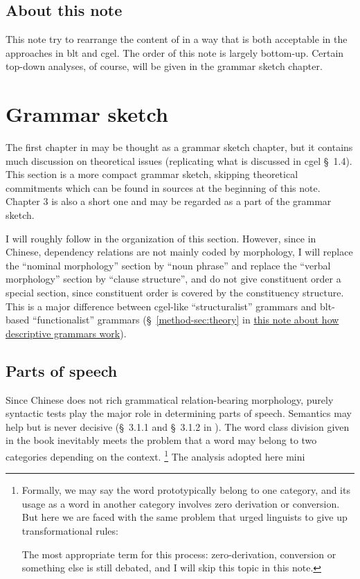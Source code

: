 \documentclass[UTF8, a4paper, oneside, scheme=plain]{ctexart}
\newcommand*{\citesec}[1]{\S~{#1}}
\newcommand{\method}{\href{../methodology/glossing.pdf}{this note about how descriptive grammars work}}
\begin{document}
\subsection{About this note}

This note try to rearrange the content of \citet{zhudexigrammar}
in a way that is both acceptable in the approaches in \ac{blt} and \ac{cgel}.
The order of this note is largely bottom-up.
Certain top-down analyses, of course, will be given in the grammar sketch chapter.

\section{Grammar sketch}

The first chapter in \citet{zhudexigrammar} may be thought as a grammar sketch chapter,
but it contains much discussion on theoretical issues
(replicating what is discussed in \ac{cgel} \citesec{1.4}).
This section is a more compact grammar sketch,
skipping theoretical commitments which can be found in sources at the beginning of this note.
Chapter 3 is also a short one and may be regarded as a part of the grammar sketch.

I will roughly follow \citet{jacques2021grammar} in the organization of this section.
However, since in Chinese, dependency relations are not mainly coded by morphology,
I will replace the ``nominal morphology'' section by ``noun phrase''
and replace the ``verbal morphology'' section by ``clause structure'',
and do not give constituent order a special section,
since constituent order is covered by the constituency structure.
This is a major difference between \ac{cgel}-like ``structuralist'' grammars 
and \ac{blt}-based ``functionalist'' grammars
(\citesec{\ref{method-sec:theory}} in \method).

\subsection{Parts of speech}

Since Chinese does not rich grammatical relation-bearing morphology,
purely syntactic tests play the major role in determining parts of speech.
Semantics may help but is never decisive 
(\citesec{3.1.1} and \citesec{3.1.2} in \citet{zhudexigrammar}).
The word class division given in the book inevitably meets the problem 
that a word may belong to two categories depending on the context.%
\footnote{
    Formally, we may say the word prototypically belong to one category,
    and its usage as a word in another category
    involves zero derivation or conversion.
    But here we are faced with the same problem that 
    urged linguists to give up transformational rules:
    
    The most appropriate term for this process:
    zero-derivation, conversion or something else is still debated,
    and I will skip this topic in this note.
}
The analysis adopted here mini
\end{document}
